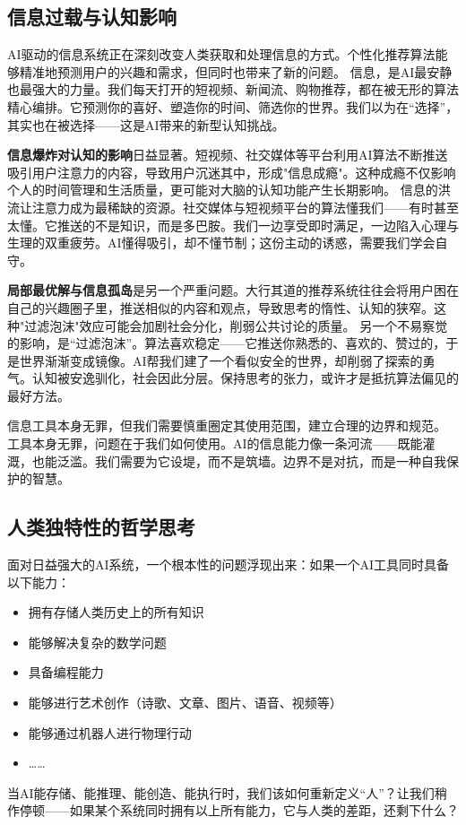 \subsection{信息过载与认知影响}

AI驱动的信息系统正在深刻改变人类获取和处理信息的方式。个性化推荐算法能够精准地预测用户的兴趣和需求，但同时也带来了新的问题。
信息，是AI最安静也最强大的力量。我们每天打开的短视频、新闻流、购物推荐，都在被无形的算法精心编排。它预测你的喜好、塑造你的时间、筛选你的世界。我们以为在“选择”，其实也在被选择——这是AI带来的新型认知挑战。

{\bf 信息爆炸对认知的影响}日益显著。短视频、社交媒体等平台利用AI算法不断推送吸引用户注意力的内容，导致用户沉迷其中，形成"信息成瘾"。这种成瘾不仅影响个人的时间管理和生活质量，更可能对大脑的认知功能产生长期影响。
信息的洪流让注意力成为最稀缺的资源。社交媒体与短视频平台的算法懂我们——有时甚至太懂。它推送的不是知识，而是多巴胺。我们一边享受即时满足，一边陷入心理与生理的双重疲劳。AI懂得吸引，却不懂节制；这份主动的诱惑，需要我们学会自守。

{\bf 局部最优解与信息孤岛}是另一个严重问题。大行其道的推荐系统往往会将用户困在自己的兴趣圈子里，推送相似的内容和观点，导致思考的惰性、认知的狭窄。这种"过滤泡沫"效应可能会加剧社会分化，削弱公共讨论的质量。
另一个不易察觉的影响，是“过滤泡沫”。算法喜欢稳定——它推送你熟悉的、喜欢的、赞过的，于是世界渐渐变成镜像。AI帮我们建了一个看似安全的世界，却削弱了探索的勇气。认知被安逸驯化，社会因此分层。保持思考的张力，或许才是抵抗算法偏见的最好方法。

信息工具本身无罪，但我们需要慎重圈定其使用范围，建立合理的边界和规范。
工具本身无罪，问题在于我们如何使用。AI的信息能力像一条河流——既能灌溉，也能泛滥。我们需要为它设堤，而不是筑墙。边界不是对抗，而是一种自我保护的智慧。

\subsection{人类独特性的哲学思考}

面对日益强大的AI系统，一个根本性的问题浮现出来：如果一个AI工具同时具备以下能力：

\begin{itemize}
\item 拥有存储人类历史上的所有知识
\item 能够解决复杂的数学问题
\item 具备编程能力
\item 能够进行艺术创作（诗歌、文章、图片、语音、视频等）
\item 能够通过机器人进行物理行动
\item ……
\end{itemize}
当AI能存储、能推理、能创造、能执行时，我们该如何重新定义“人”？让我们稍作停顿——如果某个系统同时拥有以上所有能力，它与人类的差距，还剩下什么？

